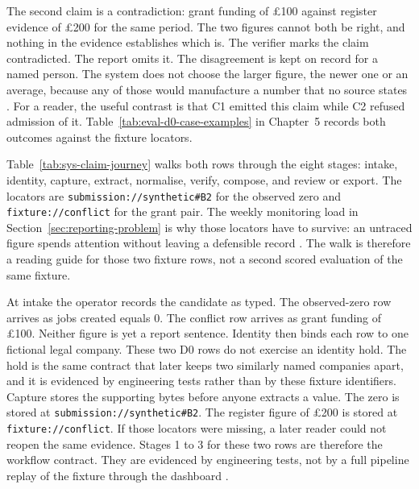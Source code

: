 The second claim is a contradiction: grant funding of \pounds100 against register evidence of
\pounds200 for the same period. The two figures cannot both be right, and nothing in the evidence
establishes which is. The verifier marks the claim contradicted. The report omits it. The disagreement
is kept on record for a named person. The system does not choose the larger figure, the newer one or
an average, because any of those would manufacture a number that no source states
\citep{gao2023alce,gao2023rarr,yue2023attrscore}. For a reader, the useful contrast is that C1
emitted this claim while C2 refused admission of it. Table~\ref{tab:eval-d0-case-examples} in
Chapter~5 records both outcomes against the fixture locators.

Table~\ref{tab:sys-claim-journey} walks both rows through the eight stages: intake, identity,
capture, extract, normalise, verify, compose, and review or export. The locators are
\texttt{submission://synthetic\#B2} for the observed zero and \texttt{fixture://conflict} for the
grant pair. The weekly monitoring load in Section~\ref{sec:reporting-problem} is why those locators
have to survive: an untraced figure spends attention without leaving a defensible record
\citep{britishbusinessbank2025equity,gompers2016vcdecisions}. The walk is therefore a reading
guide for those two fixture rows, not a second scored evaluation of the same fixture.



At intake the operator records the candidate as typed. The observed-zero row arrives as jobs
created equals 0. The conflict row arrives as grant funding of \pounds100. Neither figure is yet
a report sentence. Identity then binds each row to one fictional legal company. These two D0 rows
do not exercise an identity hold. The hold is the same contract that later keeps two similarly
named companies apart, and it is evidenced by engineering tests rather than by these fixture
identifiers. Capture stores the supporting bytes before anyone extracts a value. The zero is
stored at \texttt{submission://synthetic\#B2}. The register figure of \pounds200 is stored at
\texttt{fixture://conflict}. If those locators were missing, a later reader could not reopen the
same evidence. Stages 1 to 3 for these two rows are therefore the workflow contract. They are
evidenced by engineering tests, not by a full pipeline replay of the fixture through the
dashboard \citep{gebru2021datasheets,pineau2021reproducibility,nikiforova2020quality}.

